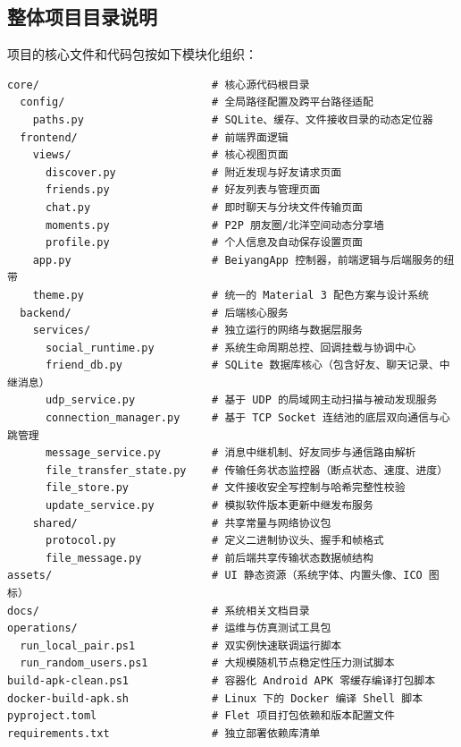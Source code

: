 \documentclass[UTF8]{ctexart}
\begin{document}
\subsection{整体项目目录说明}
项目的核心文件和代码包按如下模块化组织：
\begin{lstlisting}
core/                           # 核心源代码根目录
  config/                       # 全局路径配置及跨平台路径适配
    paths.py                    # SQLite、缓存、文件接收目录的动态定位器
  frontend/                     # 前端界面逻辑
    views/                      # 核心视图页面
      discover.py               # 附近发现与好友请求页面
      friends.py                # 好友列表与管理页面
      chat.py                   # 即时聊天与分块文件传输页面
      moments.py                # P2P 朋友圈/北洋空间动态分享墙
      profile.py                # 个人信息及自动保存设置页面
    app.py                      # BeiyangApp 控制器，前端逻辑与后端服务的纽带
    theme.py                    # 统一的 Material 3 配色方案与设计系统
  backend/                      # 后端核心服务
    services/                   # 独立运行的网络与数据层服务
      social_runtime.py         # 系统生命周期总控、回调挂载与协调中心
      friend_db.py              # SQLite 数据库核心（包含好友、聊天记录、中继消息）
      udp_service.py            # 基于 UDP 的局域网主动扫描与被动发现服务
      connection_manager.py     # 基于 TCP Socket 连结池的底层双向通信与心跳管理
      message_service.py        # 消息中继机制、好友同步与通信路由解析
      file_transfer_state.py    # 传输任务状态监控器（断点状态、速度、进度）
      file_store.py             # 文件接收安全写控制与哈希完整性校验
      update_service.py         # 模拟软件版本更新中继发布服务
    shared/                     # 共享常量与网络协议包
      protocol.py               # 定义二进制协议头、握手和帧格式
      file_message.py           # 前后端共享传输状态数据帧结构
assets/                         # UI 静态资源（系统字体、内置头像、ICO 图标）
docs/                           # 系统相关文档目录
operations/                     # 运维与仿真测试工具包
  run_local_pair.ps1            # 双实例快速联调运行脚本
  run_random_users.ps1          # 大规模随机节点稳定性压力测试脚本
build-apk-clean.ps1             # 容器化 Android APK 零缓存编译打包脚本
docker-build-apk.sh             # Linux 下的 Docker 编译 Shell 脚本
pyproject.toml                  # Flet 项目打包依赖和版本配置文件
requirements.txt                # 独立部署依赖库清单
\end{lstlisting}
\end{document}
